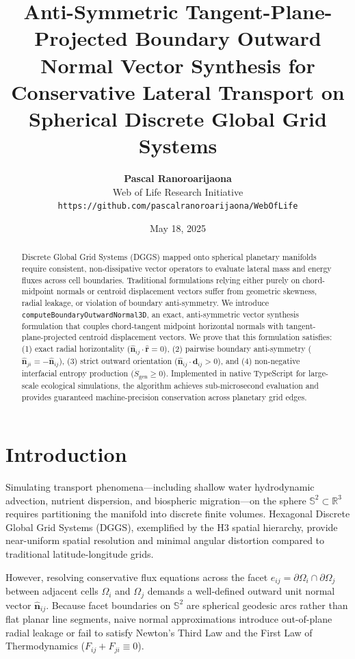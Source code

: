 \documentclass[11pt,a4paper]{article}
\title{\textbf{Anti-Symmetric Tangent-Plane-Projected Boundary Outward Normal Vector Synthesis for Conservative Lateral Transport on Spherical Discrete Global Grid Systems}}
\author{
  \textbf{Pascal Ranoroarijaona} \\
  Web of Life Research Initiative \\
  \texttt{https://github.com/pascalranoroarijaona/WebOfLife}
}
\date{May 18, 2025}
\theoremstyle{definition}
\begin{document}
\maketitle

\begin{abstract}
Discrete Global Grid Systems (DGGS) mapped onto spherical planetary manifolds require consistent, non-dissipative vector operators to evaluate lateral mass and energy fluxes across cell boundaries. Traditional formulations relying either purely on chord-midpoint normals or centroid displacement vectors suffer from geometric skewness, radial leakage, or violation of boundary anti-symmetry. We introduce \texttt{computeBoundaryOutwardNormal3D}, an exact, anti-symmetric vector synthesis formulation that couples chord-tangent midpoint horizontal normals with tangent-plane-projected centroid displacement vectors. We prove that this formulation satisfies: (1) exact radial horizontality ($\hat{\mathbf{n}}_{ij} \cdot \hat{\mathbf{r}} = 0$), (2) pairwise boundary anti-symmetry ($\hat{\mathbf{n}}_{ji} = -\hat{\mathbf{n}}_{ij}$), (3) strict outward orientation ($\hat{\mathbf{n}}_{ij} \cdot \mathbf{d}_{ij} > 0$), and (4) non-negative interfacial entropy production ($\dot{S}_{\text{gen}} \ge 0$). Implemented in native TypeScript for large-scale ecological simulations, the algorithm achieves sub-microsecond evaluation and provides guaranteed machine-precision conservation across planetary grid edges.
\end{abstract}

\section{Introduction}

Simulating transport phenomena---including shallow water hydrodynamic advection, nutrient dispersion, and biospheric migration---on the sphere $\mathbb{S}^2 \subset \mathbb{R}^3$ requires partitioning the manifold into discrete finite volumes. Hexagonal Discrete Global Grid Systems (DGGS), exemplified by the H3 spatial hierarchy, provide near-uniform spatial resolution and minimal angular distortion compared to traditional latitude-longitude grids.

However, resolving conservative flux equations across the facet $e_{ij} = \partial\Omega_i \cap \partial\Omega_j$ between adjacent cells $\Omega_i$ and $\Omega_j$ demands a well-defined outward unit normal vector $\hat{\mathbf{n}}_{ij}$. Because facet boundaries on $\mathbb{S}^2$ are spherical geodesic arcs rather than flat planar line segments, naive normal approximations introduce out-of-plane radial leakage or fail to satisfy Newton's Third Law and the First Law of Thermodynamics ($F_{ij} + F_{ji} \equiv 0$).
\end{document}

